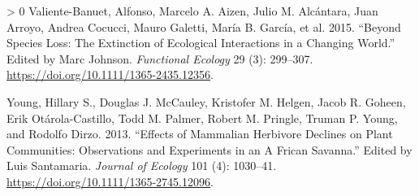 \documentclass[11pt]{article}
\newlength{\cslhangindent}
\newenvironment{CSLReferences}[3] %
 {%
  \setlength{\parindent}{0pt}
  \ifodd #1 \everypar{\setlength{\hangindent}{\cslhangindent}}\ignorespaces\fi
  \ifnum #2 > 0
  \setlength{\parskip}{#2\baselineskip}
  \fi
 }%
 {}
\begin{document}
\begin{CSLReferences}{1}{0}
\leavevmode\hypertarget{ref-Valiente-Banuet2015SpeLos}{}%
Valiente-Banuet, Alfonso, Marcelo A. Aizen, Julio M. Alcántara, Juan
Arroyo, Andrea Cocucci, Mauro Galetti, María B. García, et al. 2015.
{``Beyond Species Loss: The Extinction of Ecological Interactions in a
Changing World.''} Edited by Marc Johnson. \emph{Functional Ecology} 29
(3): 299--307. \url{https://doi.org/10.1111/1365-2435.12356}.

\leavevmode\hypertarget{ref-Young2013EffMam}{}%
Young, Hillary S., Douglas J. McCauley, Kristofer M. Helgen, Jacob R.
Goheen, Erik Otárola-Castillo, Todd M. Palmer, Robert M. Pringle, Truman
P. Young, and Rodolfo Dirzo. 2013. {``Effects of Mammalian Herbivore
Declines on Plant Communities: Observations and Experiments in an
\textsc{A} Frican Savanna.''} Edited by Luis Santamaria. \emph{Journal
of Ecology} 101 (4): 1030--41.
\url{https://doi.org/10.1111/1365-2745.12096}.

\end{CSLReferences}
\end{document}
